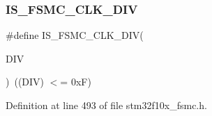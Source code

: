 \subsubsection{\texorpdfstring{I\+S\+\_\+\+F\+S\+M\+C\+\_\+\+C\+L\+K\+\_\+\+D\+IV}{IS\_FSMC\_CLK\_DIV}}
{\footnotesize\ttfamily \#define I\+S\+\_\+\+F\+S\+M\+C\+\_\+\+C\+L\+K\+\_\+\+D\+IV(\begin{DoxyParamCaption}\item[{}]{D\+IV }\end{DoxyParamCaption})~((D\+IV) $<$= 0x\+F)}



Definition at line 493 of file stm32f10x\+\_\+fsmc.\+h.

